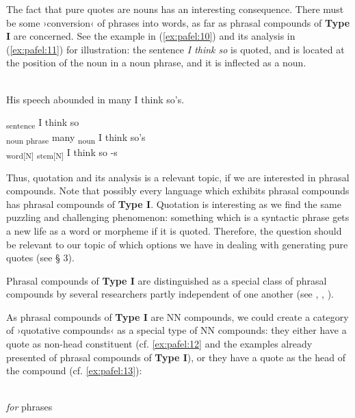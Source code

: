 \documentclass[output=paper]{LSP/langsci}
\begin{document}
The fact that pure quotes are nouns has an interesting consequence. There must be some ›conversion‹ of phrases into words, as far as phrasal compounds of \textbf{Type I} are concerned. See the example in (\ref{ex:pafel:10}) and its analysis in (\ref{ex:pafel:11}) for illustration: the sentence \textit{I think so} is quoted, and is located at the position of the noun in a noun phrase, and it is inflected as a noun.

\ea\label{ex:pafel:10}
      \\
        His speech abounded in many I think so’s. \\
\z 

\ea\label{ex:pafel:11}
      \ea\label{ex:pafel:11a}
      \glt {\ob}\textsubscript{sentence} I think so{\cb}  \\
      \ex\label{ex:pafel:11b}
      \glt {\ob}\textsubscript{noun phrase} many {\ob}\textsubscript{noun} I think so's{\cb}{\cb}  \\
      \ex\label{ex:pafel:11c}
      \glt {\ob}\textsubscript{word[N]} {\ob}\textsubscript{stem[N]} I think so{\cb} -s{\cb}  \\
     \z
\z

Thus, quotation and its analysis is a relevant topic, if we are interested in phrasal compounds. Note that possibly every language which exhibits phrasal compounds has phrasal compounds of \textbf{Type I}. Quotation is interesting as we find the same puzzling and challenging phenomenon: something which is a syntactic phrase gets a new life as a word or morpheme if it is quoted. Therefore, the question should be relevant to our topic of which options we have in dealing with generating pure quotes (see § 3).
 
Phrasal compounds of \textbf{Type I} are distinguished as a special class of phrasal compounds by several researchers partly independent of one another (see \citealt{Goksel2015}, \citealt{Pafel2015}, \citealt{TK15}).

As phrasal compounds of \textbf{Type I} are NN compounds, we could create a category of ›quotative compounds‹ as a special type of NN compounds: they either have a quote as non-head constituent (cf. \ref{ex:pafel:12} and the examples already presented of phrasal compounds of \textbf{Type I}), or they have a quote as the head of the compound (cf. \ref{ex:pafel:13}):

\ea\label{ex:pafel:12}
      \ea\label{ex:pafel:12a}
      \\
        \textit{for} phrases  \\
 
\end{document}
